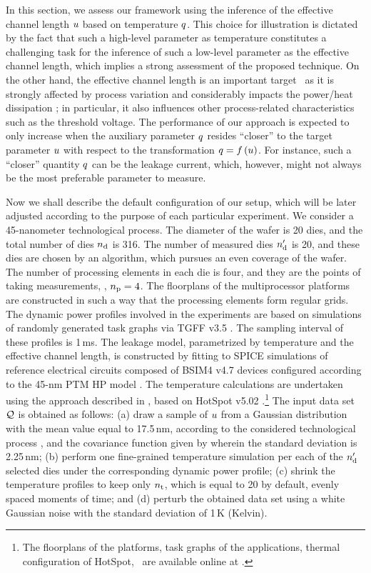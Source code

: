 
In this section, we assess our framework using the inference of the effective channel length $u$ based on temperature $q$.
This choice for illustration is dictated by the fact that such a high-level parameter as temperature constitutes a challenging task for the inference of such a low-level parameter as the effective channel length, which implies a strong assessment of the proposed technique.
On the other hand, the effective channel length is an important target \perse\ as it is strongly affected by process variation and considerably impacts the power/heat dissipation \cite{chandrakasan2001, srivastava2010, juan2012}; in particular, it also influences other process-related characteristics such as the threshold voltage.
The performance of our approach is expected to only increase when the auxiliary parameter $q$ resides ``closer'' to the target parameter $u$ with respect to the transformation $\q = \oBB{\u}$.
For instance, such a ``closer'' quantity $q$ can be the leakage current, which, however, might not always be the most preferable parameter to measure.

Now we shall describe the default configuration of our setup, which will be later adjusted according to the purpose of each particular experiment.
We consider a 45-nanometer technological process.
The diameter of the wafer is 20 dies, and the total number of dies ${n_\text{d}}$ is 316.
The number of measured dies ${n_\text{d}'}$ is 20, and these dies are chosen by an algorithm, which pursues an even coverage of the wafer.
The number of processing elements in each die is four, and they are the points of taking measurements, \ie, ${n_\text{p}} = 4$.
The floorplans of the multiprocessor platforms are constructed in such a way that the processing elements form regular grids.
The dynamic power profiles involved in the experiments are based on simulations of randomly generated task graphs via TGFF v3.5 \cite{dick1998}.
The sampling interval of these profiles is 1$\,$ms.
The leakage model, parametrized by temperature and the effective channel length, is constructed by fitting to SPICE simulations of reference electrical circuits composed of BSIM4 v4.7 devices \cite{bsim} configured according to the 45-nm PTM HP model \cite{ptm}.
The temperature calculations are undertaken using the approach described in \cite{ukhov2012}, based on HotSpot v5.02 \cite{skadron2004}.\footnote{The floorplans of the platforms, task graphs of the applications, thermal configuration of HotSpot, \etc\ are available online at \cite{sources}.}
The input data set $\mathcal{Q}$ is obtained as follows: (a) draw a sample of $u$ from a Gaussian distribution with the mean value equal to 17.5$\,$nm, according to the considered technological process \cite{ptm}, and the covariance function given by  wherein the standard deviation is 2.25$\,$nm; (b) perform one fine-grained temperature simulation per each of the ${n_\text{d}'}$ selected dies under the corresponding dynamic power profile; (c) shrink the temperature profiles to keep only ${n_\text{t}}$, which is equal to 20 by default, evenly spaced moments of time; and (d) perturb the obtained data set using a white Gaussian noise with the standard deviation of 1$\,$K (Kelvin).

